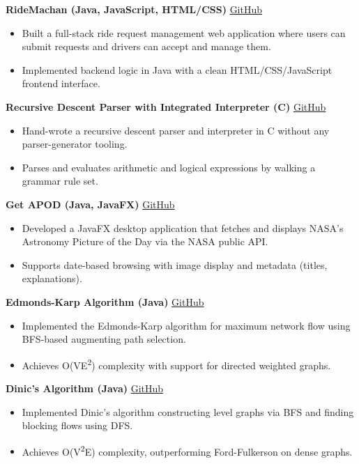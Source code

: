 \documentclass[a4paper,10pt]{article}
\begin{document}
\textbf{RideMachan (Java, JavaScript, HTML/CSS)} \hfill \href{https://github.com/Senaath-Suraweera/RideMachan}{GitHub}
\begin{itemize}
    \item Built a full-stack ride request management web application where users can submit requests and drivers can accept and manage them.
    \item Implemented backend logic in Java with a clean HTML/CSS/JavaScript frontend interface.
\end{itemize}

\textbf{Recursive Descent Parser with Integrated Interpreter (C)} \hfill \href{https://github.com/Senaath-Suraweera/Recursive-Descent-Parser-with-Integrated-Interpreter}{GitHub}
\begin{itemize}
    \item Hand-wrote a recursive descent parser and interpreter in C without any parser-generator tooling.
    \item Parses and evaluates arithmetic and logical expressions by walking a grammar rule set.
\end{itemize}

\textbf{Get APOD (Java, JavaFX)} \hfill \href{https://github.com/Senaath-Suraweera/Get-APOD}{GitHub}
\begin{itemize}
    \item Developed a JavaFX desktop application that fetches and displays NASA's Astronomy Picture of the Day via the NASA public API.
    \item Supports date-based browsing with image display and metadata (titles, explanations).
\end{itemize}

\textbf{Edmonds-Karp Algorithm (Java)} \hfill \href{https://github.com/Senaath-Suraweera/NetworkFlow-Edmonds-Karp}{GitHub}
\begin{itemize}
    \item Implemented the Edmonds-Karp algorithm for maximum network flow using BFS-based augmenting path selection.
    \item Achieves O(VE\textsuperscript{2}) complexity with support for directed weighted graphs.
\end{itemize}

\textbf{Dinic's Algorithm (Java)} \hfill \href{https://github.com/Senaath-Suraweera/NetworkFlow-Dinics}{GitHub}
\begin{itemize}
    \item Implemented Dinic's algorithm constructing level graphs via BFS and finding blocking flows using DFS.
    \item Achieves O(V\textsuperscript{2}E) complexity, outperforming Ford-Fulkerson on dense graphs.
\end{itemize}
\end{document}
